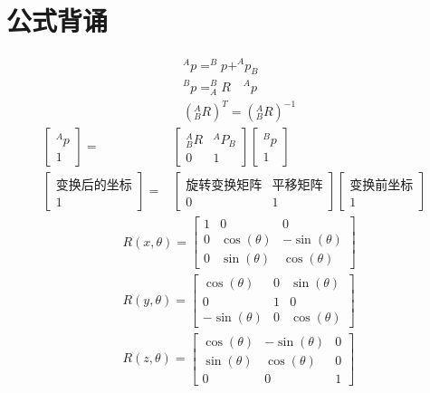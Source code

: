 \documentclass[12pt, a4paper, oneside]{ctexbook}
\begin{document}
\section{公式背诵}
\begin{align}
	&^{A}p=^{B}p+^{A}p_B\\
	&^{B}p=^{B}_{A}R {\quad} ^{A}p\\
	&(^{A}_{B}R)^{T}=(^{A}_{B}R)^{-1}
\end{align}
\begin{align}
	\left[
	\begin{matrix}
		^{A}p\\
		1
	\end{matrix}
	\right]=&
	\left[
	\begin{matrix}
		^{A}_{B}R & ^{A}P_B\\
		0 & 1
	\end{matrix}
	\right]
	\left[
	\begin{matrix}
		^{B}p\\
		1
	\end{matrix}
	\right]\\
	\left[
	\begin{matrix}
		\mbox{变换后的坐标}\\
		1
	\end{matrix}
	\right]=&
	\left[
	\begin{matrix}
		\mbox{旋转变换矩阵} & \mbox{平移矩阵}\\
		0 & 1
	\end{matrix}
	\right]
	\left[
	\begin{matrix}
		\mbox{变换前坐标}\\
		1
	\end{matrix}
	\right]
\end{align}
\begin{align}
	&R(x,\theta)=
	\left[
	\begin{matrix}
		1 & 0 & 0\\
		0 & \cos(\theta) & -\sin(\theta)\\
		0 & \sin(\theta) & \cos(\theta)
	\end{matrix}
	\right]\\
	&R(y,\theta)=
	\left[
	\begin{matrix}
		\cos(\theta) & 0 & \sin(\theta)\\
		0 & 1 & 0\\
		-\sin(\theta) & 0 & \cos(\theta)
	\end{matrix}
	\right]\\
	&R(z,\theta)=
	\left[
	\begin{matrix}
		\cos(\theta) & -\sin(\theta) & 0\\
		\sin(\theta) & \cos(\theta) & 0\\
		0 & 0 & 1
	\end{matrix}
	\right]
\end{align}
\end{document}
